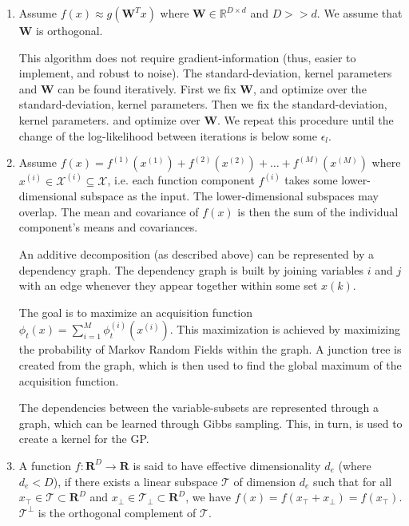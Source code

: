 \begin{enumerate}
\item \cite{Tripathy}
Assume $f(x) \approx g( \mathbf{W}^T x)$ where $ \mathbf{W} \in \mathbb{R}^{D \times d} $ and $D >> d$.
We assume that $ \mathbf{W} $ is orthogonal.

This algorithm does not require gradient-information (thus, easier to implement, and robust to noise).
The standard-deviation, kernel parameters and  $ \mathbf{W} $ can be found iteratively.
First we fix $ \mathbf{W} $, and optimize over the standard-deviation, kernel parameters.
Then we fix the standard-deviation, kernel parameters. and optimize over $ \mathbf{W} $.
We repeat this procedure until the change of the log-likelihood between iterations is below some $ \epsilon_l $.

\item \cite{Rolland}
Assume $f(x) = f^{(1)}( x^{(1)} )  + f^{(2)}( x^{(2)} ) + \ldots + f^{(M)}( x^{(M)} )$ where $ x^{(i)} \in \mathcal{X}^{(i)} \subseteq \mathcal{X}$, i.e. each function component  $f^{(i)}$ takes some lower-dimensional subspace as the input.
The lower-dimensional subspaces may overlap.
The mean and covariance of $f(x)$ is then the sum of the individual component's means and covariances.

An additive decomposition (as described above) can be represented by a dependency graph. The dependency graph is built by joining variables $i$ and $j$ with an edge whenever they appear together within some set $x(k)$. 

The goal is to maximize an acquisition function $ \phi_t(x) = \sum_{i=1}^M \phi_t^{(i)} ( x^{(i)} )$. 
This maximization is achieved by maximizing the probability of Markov Random Fields within the graph.
A junction tree is created from the graph, which is then used to find the global maximum of the acquisition function.

The dependencies between the variable-subsets are represented through a graph, which can be learned through Gibbs sampling.
This, in turn, is used to create a kernel for the GP.

\item \cite{Wang}
A function $f : \mathbf{R}^D \rightarrow \mathbf{R}$ is said to have effective dimensionality $d_e$ (where $d_e < D$), if there exists a linear subspace $\mathcal{T}$ of dimension $d_e$ such that for all $ x_\top \in \mathcal{T} \subset \mathbf{R}^D $ and $x_\perp \in \mathcal{T_\perp} \subset \mathbf{R}^D $, we have $ f(x) = f(x_\top +x_\perp ) = f(x_\top)$.
$\mathcal{T^\perp}$ is the orthogonal complement of $\mathcal{T}$.


\end{enumerate}
